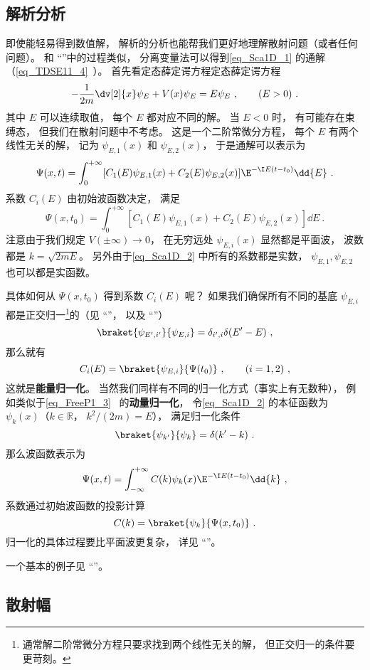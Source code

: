 \subsection{解析分析}
即使能轻易得到数值解， 解析的分析也能帮我们更好地理解散射问题（或者任何问题）。 和 “”中的过程类似， 分离变量法可以得到\autoref{eq_Sca1D_1} 的通解（\autoref{eq_TDSE11_4}~）。 首先看定态薛定谔方程定态薛定谔方程
\begin{equation}\label{eq_Sca1D_2}
-\frac{1}{2m}\dv[2]{x}\psi_E + V(x) \psi_E = E \psi_E ~,\qquad (E > 0)~.
\end{equation}
其中 $E$ 可以连续取值， 每个 $E$ 都对应不同的解。 当 $E< 0$ 时， 有可能存在束缚态， 但我们在散射问题中不考虑。 这是一个二阶常微分方程， 每个 $E$ 有两个线性无关的解， 记为 $\psi_{E,1}(x)$ 和 $\psi_{E,2}(x)$， 于是通解可以表示为
\begin{equation}
\Psi(x, t) = \int_0^{+\infty} [C_1(E) \psi_{E,1}(x) + C_2(E) \psi_{E,2}(x)] \E^{-\I E (t-t_0)} \dd{E}~.
\end{equation}
系数 $C_i(E)$ 由初始波函数决定， 满足
\begin{equation}
\Psi(x, t_0) = \int_0^{+\infty} [C_1(E) \psi_{E,1}(x) + C_2(E) \psi_{E,2}(x)] \dd{E}~.
\end{equation}
注意由于我们规定 $V(\pm\infty)\to 0$， 在无穷远处 $\psi_{E,i}(x)$ 显然都是平面波， 波数都是 $k = \sqrt{2mE}$。 另外由于\autoref{eq_Sca1D_2} 中所有的系数都是实数， $\psi_{E,1}, \psi_{E,2}$ 也可以都是实函数。

具体如何从 $\Psi(x, t_0)$ 得到系数 $C_i(E)$ 呢？ 如果我们确保所有不同的基底 $\psi_{E,i}$ 都是正交归一\footnote{通常解二阶常微分方程只要求找到两个线性无关的解， 但正交归一的条件要更苛刻。}的（见 “”， 以及 “”）
\begin{equation}
\braket{\psi_{E',i'}}{\psi_{E,i}} = \delta_{i',i}\delta(E' - E)~,
\end{equation}
那么就有
\begin{equation}
C_i(E) = \braket{\psi_{E,i}}{\Psi(t_0)}~, \qquad (i = 1,2)~,
\end{equation}
这就是\textbf{能量归一化}。 当然我们同样有不同的归一化方式（事实上有无数种）， 例如类似于\autoref{eq_FreeP1_3}~ 的\textbf{动量归一化}， 令\autoref{eq_Sca1D_2} 的本征函数为 $\psi_{k}(x)$（$k \in \mathbb R$， $k^2/(2m) = E$）， 满足归一化条件
\begin{equation}
\braket{\psi_{k'}}{\psi_{k}} = \delta(k' - k)~.
\end{equation}
那么波函数表示为
\begin{equation}\label{eq_Sca1D_3}
\Psi(x, t) = \int_{-\infty}^{+\infty} C(k) \psi_k(x)\E^{-\I E (t-t_0)} \dd{k}~,
\end{equation}
系数通过初始波函数的投影计算
\begin{equation}
C(k) = \braket{\psi_k}{\Psi(x, t_0)}~.
\end{equation}
归一化的具体过程要比平面波更复杂， 详见 “”。

一个基本的例子见 “”。

\subsection{散射幅}
